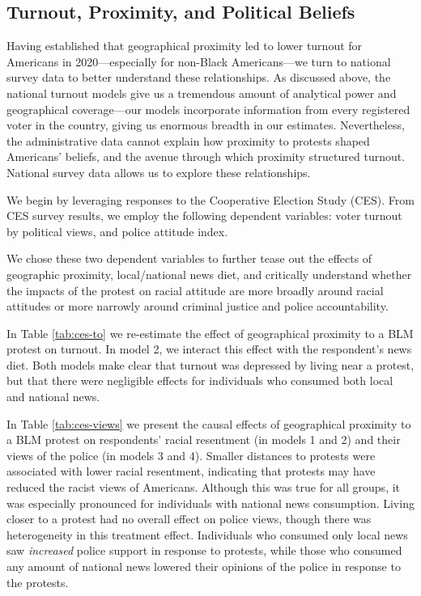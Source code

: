 \documentclass[
  12pt,
]{article}
\begin{document}
\hypertarget{turnout-proximity-and-political-beliefs}{%
\subsection*{Turnout, Proximity, and Political Beliefs}\label{turnout-proximity-and-political-beliefs}}

Having established that geographical proximity led to lower turnout for Americans in 2020---especially for non-Black Americans---we turn to national survey data to better understand these relationships. As discussed above, the national turnout models give us a tremendous amount of analytical power and geographical coverage---our models incorporate information from every registered voter in the country, giving us enormous breadth in our estimates. Nevertheless, the administrative data cannot explain how proximity to protests shaped Americans' beliefs, and the avenue through which proximity structured turnout. National survey data allows us to explore these relationships.

We begin by leveraging responses to the Cooperative Election Study (CES). From CES survey results, we employ the following dependent variables: voter turnout by political views, and police attitude index.

We chose these two dependent variables to further tease out the effects of geographic proximity, local/national news diet, and critically understand whether the impacts of the protest on racial attitude are more broadly around racial attitudes or more narrowly around criminal justice and police accountability.

In Table \ref{tab:ces-to} we re-estimate the effect of geographical proximity to a BLM protest on turnout. In model 2, we interact this effect with the respondent's news diet. Both models make clear that turnout was depressed by living near a protest, but that there were negligible effects for individuals who consumed both local and national news.

\begin{singlespace}

\end{singlespace}

In Table \ref{tab:ces-views} we present the causal effects of geographical proximity to a BLM protest on respondents' racial resentment (in models 1 and 2) and their views of the police (in models 3 and 4). Smaller distances to protests were associated with lower racial resentment, indicating that protests may have reduced the racist views of Americans. Although this was true for all groups, it was especially pronounced for individuals with national news consumption. Living closer to a protest had no overall effect on police views, though there was heterogeneity in this treatment effect. Individuals who consumed only local news saw \emph{increased} police support in response to protests, while those who consumed any amount of national news lowered their opinions of the police in response to the protests.
\end{document}
